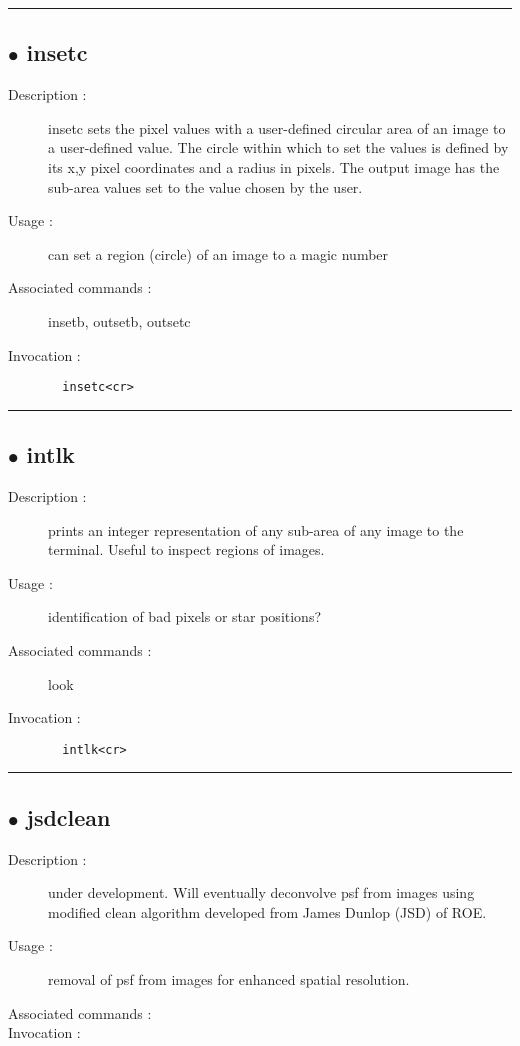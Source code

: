 \hrule \subsection*{$\bullet$ insetc}
\begin{description}
\item[Description :] insetc sets the pixel values with a user-defined circular area
of an image to a user-defined value.  The circle within which to set the
values is defined by its x,y pixel coordinates and a radius in pixels.
The output image has the sub-area values set to the value chosen by the
user.
\item[Usage :] can set a region (circle) of an image to a magic number
\item[Associated commands :] insetb, outsetb, outsetc
\item[Invocation :]

\verb+  insetc<cr> +\end{description}

\hrule \subsection*{$\bullet$ intlk}
\begin{description}
\item[Description :] prints an integer representation of any sub-area of any image to
the terminal.  Useful to inspect regions of images. 
\item[Usage :] identification of bad pixels or star positions?
\item[Associated commands :] look
\item[Invocation :]

\verb+  intlk<cr> +\end{description}

\hrule \subsection*{$\bullet$ jsdclean}
\begin{description}
\item[Description :] under development.  Will eventually deconvolve psf from images
using modified clean algorithm developed from James Dunlop (JSD) of ROE.
\item[Usage :] removal of psf from images for enhanced spatial resolution.
\item[Associated commands :] 
\item[Invocation :]
\end{description}

